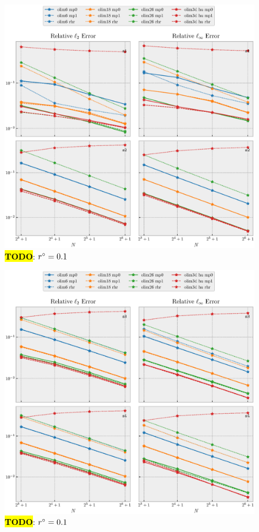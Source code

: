\documentclass[sisc-eikonal.tex]{subfiles}
\begin{document}
\begin{figure}[H]
  \centering
  \includegraphics[width=\linewidth]{size_vs_error_3d_part1.eps}
  \caption{\hl{\textbf{TODO}}: $r^\circ = 0.1$}
\end{figure}

\begin{figure}[H]
  \centering
  \includegraphics[width=\linewidth]{size_vs_error_3d_part2.eps}
  \caption{\hl{\textbf{TODO}}: $r^\circ = 0.1$}
\end{figure}
\end{document}
